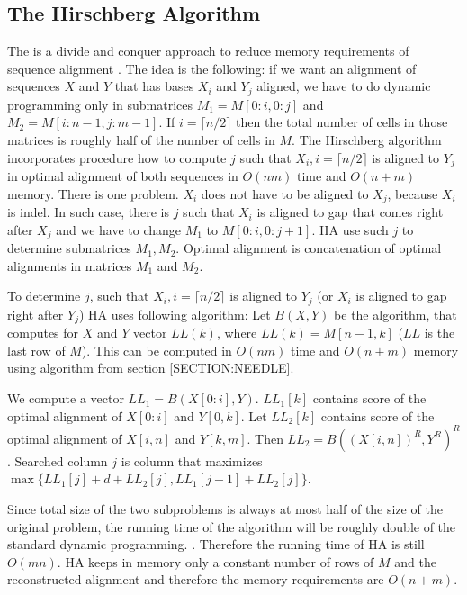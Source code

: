  
\subsection{The Hirschberg Algorithm}

The  is a divide and conquer approach to reduce
memory requirements of sequence alignment \cite{Hirschberg1975}. The idea is
the following: if we want an alignment of sequences $X$ and $Y$ that has bases $X_i$
and $Y_j$ aligned, we have to  do dynamic programming only in submatrices
$M_1=M[0:i,0:j]$ and $M_2=M[i:n-1,j:m-1]$. If $i=\lceil n/2\rceil$ then
the total number of cells in those matrices is roughly half of the number of
cells in $M$. The Hirschberg algorithm incorporates procedure how to compute 
$j$ such that $X_i, i=\lceil n/2\rceil$ is aligned to $Y_j$ in optimal alignment of both sequences in $O(nm)$
time and $O(n+m)$ memory. There is one problem. $X_i$ does not have to
be aligned to $X_j$, because $X_i$ is indel. In such case, there is $j$ such
that $X_i$ is aligned to gap that comes right after $X_j$ and we have to change
$M_1$ to $M[0:i,0:j+1]$. HA use such $j$ to determine submatrices $M_1,M_2$.
Optimal alignment is concatenation of optimal alignments in matrices $M_1$ and
$M_2$.

To determine $j$, such that $X_i,i=\lceil n/2\rceil$ is aligned to $Y_j$ (or
$X_i$ is aligned to gap right after $Y_j$) HA uses following algorithm: Let
$B(X,Y)$ be the algorithm, that computes for $X$ and $Y$ vector $LL(k)$, where
$LL(k)=M[n-1,k]$ ($LL$ is the last row of $M$). This can be computed in
$O(nm)$ time and $O(n+m)$ memory using algorithm from section
\ref{SECTION:NEEDLE}.  

We compute a vector $LL_1=B(X[0:i],Y)$. $LL_1[k]$ contains score of the optimal
alignment of $X[0:i]$ and $Y[0,k]$. Let $LL_2[k]$ contains score of the optimal
alignment of $X[i,n]$ and $Y[k,m]$. Then $LL_2=B( (X[i,n])^R,Y^R)^R$.
Searched column $j$ is column that maximizes $\max\{LL_1[j]+d+LL_2[j],
LL_1[j-1]+LL_2[j] \}$.

Since total size of the two subproblems is always at most half of the size of the
original problem, the running time of the algorithm will be roughly double of
the standard dynamic programming.
. Therefore the
running time of HA is still $O(mn)$. HA keeps in memory only a constant number
of rows of $M$ and the reconstructed alignment and therefore the memory requirements are
$O(n+m)$.

